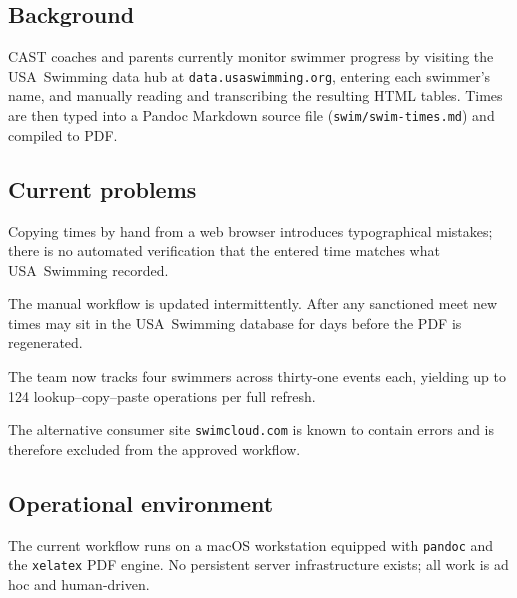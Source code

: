 \documentclass[12pt]{article}
\newcommand{\code}[1]{\texttt{#1}}
\begin{document}
\subsection{Background}

CAST coaches and parents currently monitor swimmer progress by
visiting the USA~Swimming data hub at
\texttt{data.usaswimming.org}, entering each swimmer's name, and
manually reading and transcribing the resulting HTML tables.
Times are then typed into a Pandoc Markdown source file
(\code{swim/swim-times.md}) and compiled to PDF.

\subsection{Current problems}

\begin{description}[style=nextline]
  \item[Manual transcription errors.]
        Copying times by hand from a web browser introduces
        typographical mistakes; there is no automated verification
        that the entered time matches what USA~Swimming recorded.

  \item[Stale data.]
        The manual workflow is updated intermittently.  After any
        sanctioned meet new times may sit in the USA~Swimming
        database for days before the PDF is regenerated.

  \item[Scalability.]
        The team now tracks four swimmers across thirty-one events
        each, yielding up to 124 lookup--copy--paste operations per
        full refresh.

  \item[Swimcloud unreliability.]
        The alternative consumer site \texttt{swimcloud.com} is
        known to contain errors and is therefore excluded from the
        approved workflow.
\end{description}

\subsection{Operational environment}

The current workflow runs on a macOS workstation equipped with
\code{pandoc} and the \code{xelatex} PDF engine.  No persistent
server infrastructure exists; all work is ad hoc and human-driven.

\end{document}
